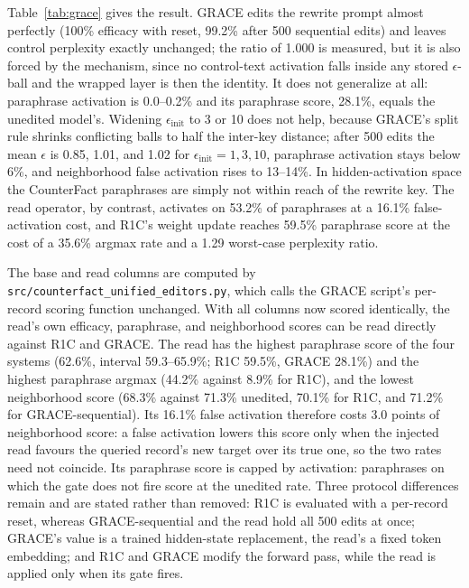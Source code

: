 \documentclass[preprint,12pt]{elsarticle}
\newif\ifmarkchanges
\newcommand{\rev}[1]{\ifmarkchanges{\color{blue}#1}\else#1\fi}
\begin{document}
Table~\ref{tab:grace} gives the result. GRACE edits the rewrite prompt almost perfectly (100\% efficacy with reset, 99.2\% after 500 sequential edits) and leaves control perplexity exactly unchanged; the ratio of 1.000 is measured, but it is also forced by the mechanism, since no control-text activation falls inside any stored $\epsilon$-ball and the wrapped layer is then the identity. It does not generalize at all: paraphrase activation is 0.0--0.2\% and its paraphrase score, 28.1\%, equals the unedited model's. Widening $\epsilon_{\mathrm{init}}$ to 3 or 10 does not help, because GRACE's split rule shrinks conflicting balls to half the inter-key distance; after 500 edits the mean $\epsilon$ is 0.85, 1.01, and 1.02 for $\epsilon_{\mathrm{init}}=1,3,10$, paraphrase activation stays below 6\%, and neighborhood false activation rises to 13--14\%. In hidden-activation space the CounterFact paraphrases are simply not within reach of the rewrite key. The read operator, by contrast, activates on 53.2\% of paraphrases at a 16.1\% false-activation cost, and R1C's weight update reaches 59.5\% paraphrase score at the cost of a 35.6\% argmax rate and a 1.29 worst-case perplexity ratio.

\rev{The base and read columns are computed by \texttt{src/counterfact\_unified\_editors.py}, which calls the GRACE script's per-record scoring function unchanged. With all columns now scored identically, the read's own efficacy, paraphrase, and neighborhood scores can be read directly against R1C and GRACE. The read has the highest paraphrase score of the four systems (62.6\%, interval 59.3--65.9\%; R1C 59.5\%, GRACE 28.1\%) and the highest paraphrase argmax (44.2\% against 8.9\% for R1C), and the lowest neighborhood score (68.3\% against 71.3\% unedited, 70.1\% for R1C, and 71.2\% for GRACE-sequential). Its 16.1\% false activation therefore costs 3.0 points of neighborhood score: a false activation lowers this score only when the injected read favours the queried record's new target over its true one, so the two rates need not coincide. Its paraphrase score is capped by activation: paraphrases on which the gate does not fire score at the unedited rate.} Three protocol differences remain and are stated rather than removed: R1C is evaluated with a per-record reset, whereas GRACE-sequential and the read hold all 500 edits at once; GRACE's value is a trained hidden-state replacement, the read's a fixed token embedding; and R1C and GRACE modify the forward pass, while the read is applied only when its gate fires.
\end{document}
